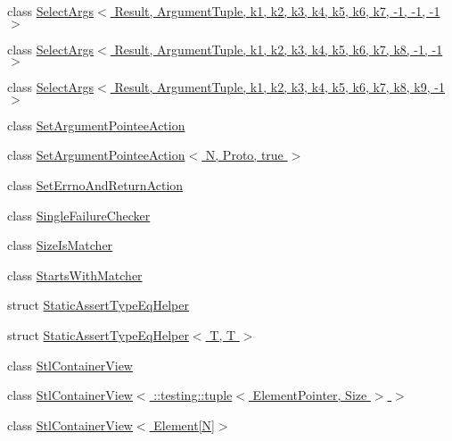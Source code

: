 \begin{DoxyCompactItemize}
\item 
class \hyperlink{classtesting_1_1internal_1_1_select_args_3_01_result_00_01_argument_tuple_00_01k1_00_01k2_00_01kf4b89906ed32c76471b80b75f77e1355}{Select\+Args$<$ Result, Argument\+Tuple, k1, k2, k3, k4, k5, k6, k7, -\/1, -\/1, -\/1 $>$}
\item 
class \hyperlink{classtesting_1_1internal_1_1_select_args_3_01_result_00_01_argument_tuple_00_01k1_00_01k2_00_01ke29a32f440a8fcb098d8685a265f9f40}{Select\+Args$<$ Result, Argument\+Tuple, k1, k2, k3, k4, k5, k6, k7, k8, -\/1, -\/1 $>$}
\item 
class \hyperlink{classtesting_1_1internal_1_1_select_args_3_01_result_00_01_argument_tuple_00_01k1_00_01k2_00_01k6840fe77dccd76bc2d4e4ee1c75cd6f1}{Select\+Args$<$ Result, Argument\+Tuple, k1, k2, k3, k4, k5, k6, k7, k8, k9, -\/1 $>$}
\item 
class \hyperlink{classtesting_1_1internal_1_1_set_argument_pointee_action}{Set\+Argument\+Pointee\+Action}
\item 
class \hyperlink{classtesting_1_1internal_1_1_set_argument_pointee_action_3_01_n_00_01_proto_00_01true_01_4}{Set\+Argument\+Pointee\+Action$<$ N, Proto, true $>$}
\item 
class \hyperlink{classtesting_1_1internal_1_1_set_errno_and_return_action}{Set\+Errno\+And\+Return\+Action}
\item 
class \hyperlink{classtesting_1_1internal_1_1_single_failure_checker}{Single\+Failure\+Checker}
\item 
class \hyperlink{classtesting_1_1internal_1_1_size_is_matcher}{Size\+Is\+Matcher}
\item 
class \hyperlink{classtesting_1_1internal_1_1_starts_with_matcher}{Starts\+With\+Matcher}
\item 
struct \hyperlink{structtesting_1_1internal_1_1_static_assert_type_eq_helper}{Static\+Assert\+Type\+Eq\+Helper}
\item 
struct \hyperlink{structtesting_1_1internal_1_1_static_assert_type_eq_helper_3_01_t_00_01_t_01_4}{Static\+Assert\+Type\+Eq\+Helper$<$ T, T $>$}
\item 
class \hyperlink{classtesting_1_1internal_1_1_stl_container_view}{Stl\+Container\+View}
\item 
class \hyperlink{classtesting_1_1internal_1_1_stl_container_view_3_01_1_1testing_1_1tuple_3_01_element_pointer_00_01_size_01_4_01_4}{Stl\+Container\+View$<$ \+::testing\+::tuple$<$ Element\+Pointer, Size $>$ $>$}
\item 
class \hyperlink{classtesting_1_1internal_1_1_stl_container_view_3_01_element[_n]_4}{Stl\+Container\+View$<$ Element\mbox{[}\+N\mbox{]}$>$}

\end{DoxyCompactItemize}
